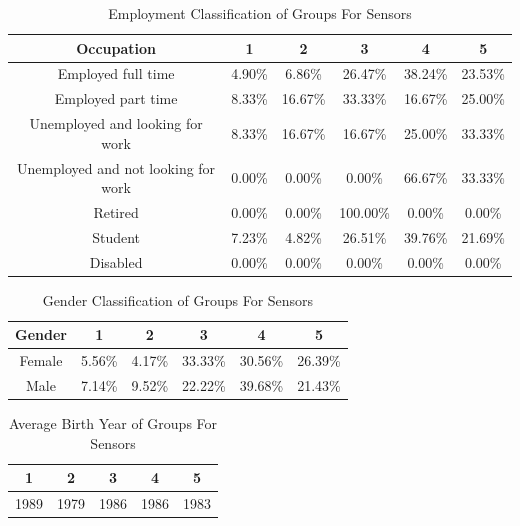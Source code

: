 \begin{table}[h!]
  \centering
  \caption{Employment Classification of Groups For Sensors}
  \label{tab:emp_sensors}
  \begin{tabular}{cccccc}
    \toprule
     Occupation&1&2&3&4&5\\
    \midrule
Employed full time&4.90\%&6.86\%&26.47\%&38.24\%&23.53\%\\
Employed part time&8.33\%&16.67\%&33.33\%&16.67\%&25.00\%\\
Unemployed and looking for work&8.33\%&16.67\%&16.67\%&25.00\%&33.33\%\\
Unemployed and not looking for work&0.00\%&0.00\%&0.00\%&66.67\%&33.33\%\\
Retired&0.00\%&0.00\%&100.00\%&0.00\%&0.00\%\\
Student&7.23\%&4.82\%&26.51\%&39.76\%&21.69\%\\
Disabled&0.00\%&0.00\%&0.00\%&0.00\%&0.00\%\\
    \bottomrule
  \end{tabular}
\end{table}



\begin{table}[h!]
  \centering
  \caption{Gender Classification of Groups For Sensors}
  \label{tab:gender_sensors}
  \begin{tabular}{cccccc}
    \toprule
     Gender&1&2&3&4&5 \\
    \midrule
Female&5.56\%&4.17\%&33.33\%&30.56\%&26.39\% \\
Male&7.14\%&9.52\%&22.22\%&39.68\%&21.43\% \\
    \bottomrule
  \end{tabular}
\end{table}



\begin{table}[h!]
  \centering
  \caption{Average Birth Year of Groups For Sensors}
  \label{tab:year_sensors}
  \begin{tabular}{ccccc}
    \toprule
     1&2&3&4&5\\
    \midrule
	1989& 1979& 1986& 1986& 1983\\
    \bottomrule
  \end{tabular}
\end{table}


